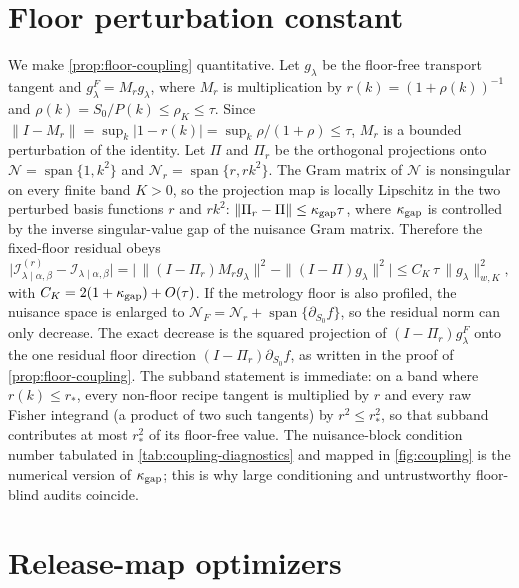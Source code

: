 \documentclass[11pt]{article}
\newcommand{\calI}{\mathcal I}
\newcommand{\calN}{\mathcal N}
\begin{document}
\section{Floor perturbation constant}
\label{app:floor}

We make \cref{prop:floor-coupling} quantitative. Let \(g_\lambda\) be the floor-free transport tangent and \(g_\lambda^F=M_rg_\lambda\), where \(M_r\) is multiplication by \(r(k)=(1+\rho(k))^{-1}\) and \(\rho(k)=S_0/P(k)\le\rho_K\le\tau\). Since \(\|I-M_r\|=\sup_k|1-r(k)|=\sup_k\rho/(1+\rho)\le\tau\), \(M_r\) is a bounded perturbation of the identity. Let \(\Pi\) and \(\Pi_r\) be the orthogonal projections onto \(\calN=\operatorname{span}\{1,k^2\}\) and \(\calN_r=\operatorname{span}\{r,rk^2\}\). The Gram matrix of \(\calN\) is nonsingular on every finite band \(K>0\), so the projection map is locally Lipschitz in the two perturbed basis functions \(r\) and \(rk^2\): \(\|\Pi_r-\Pi\|\le \kappa_{\rm gap}\tau\), where \(\kappa_{\rm gap}\) is controlled by the inverse singular-value gap of the nuisance Gram matrix. Therefore the fixed-floor residual obeys
\begin{equation}
\big|\calI_{\lambda\mid\alpha,\beta}^{(r)}-\calI_{\lambda\mid\alpha,\beta}\big|
=\big|\,\|(I-\Pi_r)M_rg_\lambda\|^2-\|(I-\Pi)g_\lambda\|^2\big|
\le C_K\,\tau\,\|g_\lambda\|_{w,K}^2,
\label{eq:appE-bound}
\end{equation}
with \(C_K=2(1+\kappa_{\rm gap})+O(\tau)\). If the metrology floor is also profiled, the nuisance space is enlarged to \(\calN_F=\calN_r+\operatorname{span}\{\partial_{S_0}f\}\), so the residual norm can only decrease. The exact decrease is the squared projection of \((I-\Pi_r)g_\lambda^F\) onto the one residual floor direction \((I-\Pi_r)\partial_{S_0}f\), as written in the proof of \cref{prop:floor-coupling}. The subband statement is immediate: on a band where \(r(k)\le r_*\), every non-floor recipe tangent is multiplied by \(r\) and every raw Fisher integrand (a product of two such tangents) by \(r^2\le r_*^2\), so that subband contributes at most \(r_*^2\) of its floor-free value. The nuisance-block condition number tabulated in \cref{tab:coupling-diagnostics} and mapped in \cref{fig:coupling} is the numerical version of \(\kappa_{\rm gap}\); this is why large conditioning and untrustworthy floor-blind audits coincide.

\section{Release-map optimizers}
\label{app:optimizers}
\end{document}
